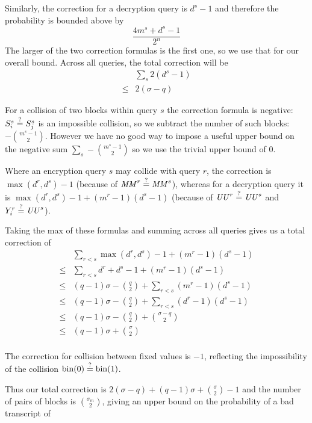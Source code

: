 \documentclass[hctr.tex]{subfiles}
\begin{document}
Similarly, the correction for a decryption query is
\(d^s - 1\) and therefore  the probability 
is bounded above by
\begin{displaymath}
    \frac{4m^s + d^s -1}{2^n}
\end{displaymath}
The larger of the two correction formulas is
the first one, so we use that for our overall bound.
Across all queries, the total
correction will be
\begin{align*}
    &\sum_s 2(d^s - 1) \\
    \leq & 2(\sigma - q)
\end{align*}

For a collision of two blocks within query \(s\)
the correction formula is negative:
\(S_i^s \stackrel{\text{?}}{=} S_j^s\) is an impossible collision, 
so we subtract the number of such blocks:
\(-\binom{m^s -1}{2}\). However we have no good way
to impose a useful upper bound on the negative sum
\(\sum_s-\binom{m^s -1}{2}\) so we use the
trivial upper bound of 0.

Where an encryption query \(s\)
may collide with query \(r\), the correction is 
\(\max(d^r, d^s) -1\)
(because of \(\mathit{MM}^r \stackrel{\text{?}}{=} \mathit{MM}^s\)), whereas for a decryption query
it is \(\max(d^r, d^s) -1 + (m^r -1 )(d^s -1)\)
(because of \(\mathit{UU}^r \stackrel{\text{?}}{=} \mathit{UU}^s\) and \(Y_i^r \stackrel{\text{?}}{=} \mathit{UU}^s\)).

Taking the max of these formulas and summing across
all queries gives us a total correction of
\begin{align*}
    &\sum_{r < s} \max(d^r, d^s) -1 + (m^r -1 )(d^s -1)\\
    \leq & \sum_{r < s} d^r + d^s -1 + (m^r -1 )(d^s -1)\\
    \leq & (q-1)\sigma - \binom{q}{2} + \sum_{r < s} (m^r -1 )(d^s -1) \\
    \leq & (q-1)\sigma - \binom{q}{2} + \sum_{r < s} (d^r -1)(d^s -1) \\
    \leq & (q-1)\sigma - \binom{q}{2} + \binom{\sigma - q}{2} \\
   \leq & (q-1)\sigma + \binom{\sigma}{2} \\
\end{align*}

The correction for collision between fixed values
is \(-1\), reflecting the impossibility of the collision
\(\operatorname{bin}(0) \stackrel{\text{?}}{=} \operatorname{bin}(1)\).

Thus our total correction is
\(2(\sigma - q) + (q-1)\sigma + \binom{\sigma}{2} -1\)
and the number of pairs of blocks is \(\binom{\sigma_m}{2}\), 
giving an upper bound
on the probability of a bad transcript of
\end{document}
